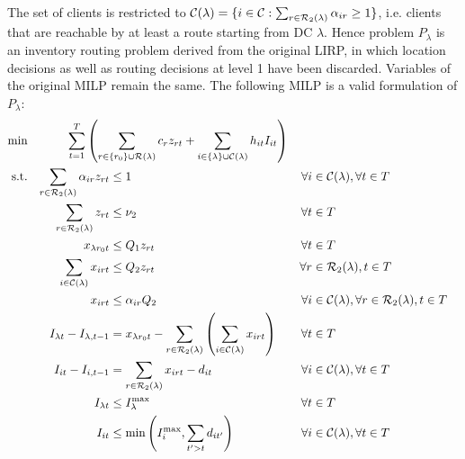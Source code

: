 \documentclass[a4paper,10pt]{article}
\begin{document}
\begin{linenumbers}
The set of clients is restricted to $\mathcal{C}(\lambda) =\{i\in\mathcal{C}: \sum_{r\in\mathcal{R}_2(\lambda)} \alpha_{ir}\geq 1 \}$, i.e. clients that are reachable by at least a route starting from DC $\lambda$. 
Hence problem $P_{\lambda}$ is an inventory routing problem derived from the original LIRP, in which location decisions as well as routing decisions at level 1 have been discarded. 
Variables of the original MILP remain the same. 
The following MILP is a valid formulation of $P_{\lambda}$:
%
\begin{alignat}{3}
	\text{min} &&\sum_{t=1}^{T} \left( \sum_{r\in \{r_0\} \cup \ro(\lambda)} c_r z_{rt} + \sum_{i\in \left\{\lambda\right\}\cup \cu(\lambda)} h_{it} I_{it}\right) \span\omit\label{decomp_objfunct}\\ 
	\text{s.t.}  %
	&&\sum_{r\in \ro_2(\lambda)} \alpha_{ir} z_{rt} &\leq 1 															&\forall i&\in \cu(\lambda), \forall t\in T  \label{const:decomp_singleroutecustomers}\\
	&&\sum_{r\in \ro_2(\lambda)} z_{rt} &\leq 	\nu_2		&\forall t&\in T  \label{const:decomp_fleetcapa}\\
	&&x_{\lambda r_0 t}   		&\leq Q_1 z_{rt} 		&\forall t&\in T\label{const:decomp_deliveryDCUB}\\
	&&\sum_{i\in \cu(\lambda)} x_{irt}   		&\leq Q_2 z_{rt} 														&\forall r&\in \ro_2(\lambda), t\in T\label{const:decomp_deliveryUB}\\
	&&x_{irt}   		&\leq \alpha_{ir} Q_2  			&\forall i&\in\cu(\lambda), \forall r\in \ro_2(\lambda), t\in T\label{const:decomp_deliveryConstLoc}\\
	&&I_{\lambda t}- I_{\lambda,t-1} &=     x_{\lambda r_0 t}   - \sum_{r\in \ro_2(\lambda)}\left( \sum_{i\in \cu(\lambda)}x_{irt}\right)\quad 			&\forall t& \in T \label{const:decomp_invflowdepots}\\
	&&I_{it} - I_{i,t-1} &= \sum_{r\in \ro_2(\lambda)} x_{irt} - d_{it} 			&\forall i&\in \cu(\lambda), \forall t\in T\label{const:decomp_dinvflowcustomers}\\
	&&I_{\lambda t}	&\leq I_\lambda^{\max}  			& \forall t&\in T\label{const:decomp_invdepotUB}\\	
	&&I_{it} 		& \leq \min\left(I_i^{\max}, \sum_{t' > t}d_{it'}\right)											&\forall i&\in \cu(\lambda), \forall t\in T\label{const:decomp_invcustUB}\\

\end{alignat}
\end{linenumbers}
\end{document}
